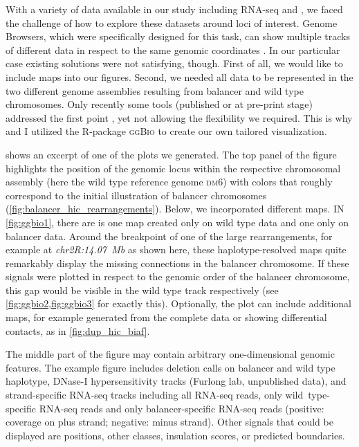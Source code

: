 With a variety of data available in our study including RNA-seq and \hic, we
faced the challenge of how to explore these datasets around loci of interest.
Genome Browsers, which were specifically designed for this task, can show
multiple tracks of different data in respect to the same genomic coordinates
\citep{Freese2016,Thorvaldsdottir2013,Gramates2017}. In our particular case
existing solutions were not satisfying, though. First of all, we would like to
include \hic maps into our figures. Second, we needed all data to be
represented in the two different genome assemblies resulting from balancer and
wild type chromosomes. Only recently some tools (published or at pre-print
stage) addressed the first point \citep{Ramirez2018,Kerpedjiev2017}, yet not
allowing the flexibility we required. This is why \alek and I utilized the
R-package \textsc{ggBio} \citep{Yin2012} to create our own tailored
visualization.


 shows an excerpt of one of the plots we generated. The top
panel of the figure highlights  the position of the genomic locus
within the respective chromosomal assembly (here the wild type reference genome
\textsc{dm6}) with colors that roughly correspond to the initial illustration of
balancer chromosomes (\cref{fig:balancer_hic_rearrangements}). Below, we
incorporated different \hic maps. IN \cref{fig:ggbio1}, there are is one \hic
map created only on  wild type data and one only on 
balancer \hic data. Around the breakpoint of one of the large rearrangements,
for example at \textit{chr2R:14.07~Mb} as shown here, these haplotype-resolved
\hic maps quite remarkably display the missing connections in the balancer
chromosome. If these signals were plotted in respect to the genomic order of
the balancer chromosome, this gap would be visible in the wild type track
respectively (see \cref{fig:ggbio2,fig:ggbio3} for exactly this).
Optionally, the plot can include additional \hic maps, for
example generated from the complete data or showing differential contacts,
as in \cref{fig:dup_hic_biaf}.

The middle part of the figure may contain arbitrary one-dimensional genomic
features. The example figure includes  deletion calls on balancer and
wild type haplotype,  DNase-I hypersensitivity tracks (Furlong lab,
unpublished data), and strand-specific RNA-seq tracks including  all
RNA-seq reads, only  wild\ type-specific RNA-seq reads and only
 balancer-specific RNA-seq reads (positive: coverage on plus strand;
negative: minus strand). Other signals that could be displayed
are \snv positions, other \sv classes, insulation scores, or predicted
\tad boundaries.


